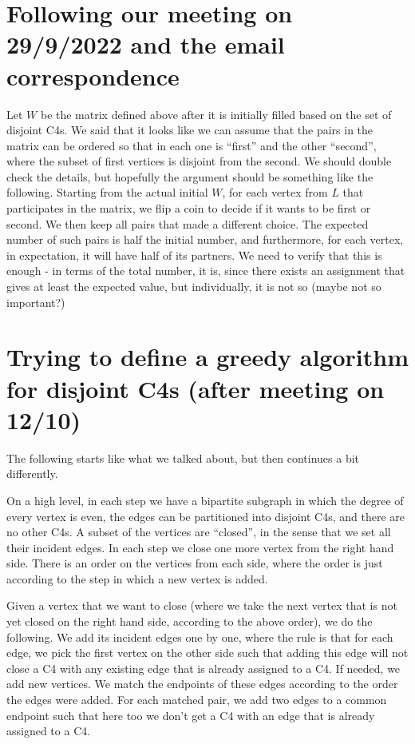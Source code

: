 \documentclass{article}
\begin{document}
\section{Following our meeting on 29/9/2022 and the email correspondence}

Let $W$ be the matrix defined above after it is initially filled based on the set of disjoint C4s. We said that it looks like we can assume that the pairs in the matrix can be ordered so that in each one is ``first'' and the other ``second'', where the subset of first vertices is disjoint from the second. We should double check the details, but hopefully the argument should be something like the following. Starting from the actual initial $W$, for each vertex from $L$ that participates in the matrix, we flip a coin to decide if it wants to be first or second. We then keep all pairs that made a different choice. The expected number of such pairs is half the initial number, and furthermore, for each vertex, in expectation, it will have half of its partners. We need to verify that this is enough - in terms of the total number, it is, since there exists an assignment that gives at least the expected value, but individually, it is not so (maybe not so important?)
\fi

\section{Trying to define a greedy algorithm for disjoint C4s (after meeting on 12/10)}

The following starts like what we talked about, but then continues a bit differently.

On a high level, in each step
we have a bipartite subgraph in which the degree of every vertex is even, the edges can be partitioned into disjoint C4s, and there are no other C4s. A subset of the vertices are ``closed'', in the sense that we set all their incident edges. In each step we close one more vertex from the right hand side. There is  an order on the vertices from each side, where the order is just according to the step in which a new vertex is added.

Given a vertex that we want to close (where we take the next vertex that is not yet closed on the right hand side, according to the above order), we do the following. We add its incident edges one by one, where the rule is that for each edge, we pick the first vertex on the other side such that adding this edge will not close a C4 with any existing edge that is already assigned to a C4. If needed, we add new vertices. We match the endpoints of these edges according to the order the edges were added. For each matched pair, we add two edges to a common endpoint such that here too we don't get a C4 with an edge that is already assigned to a C4.
\end{document}
